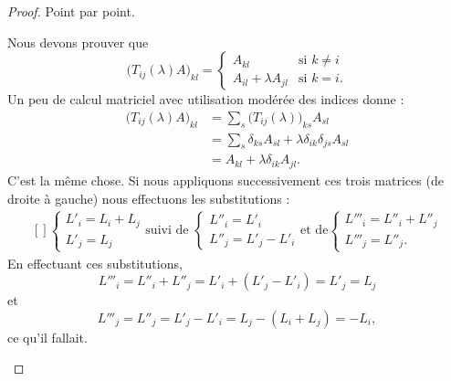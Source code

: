 \begin{proof}
	Point par point.
	\begin{subproof}
		Nous devons prouver que
		\begin{equation}
			\big( T_{ij}(\lambda)A \big)_{kl}=\begin{cases}
				A_{kl}                & \text{si } k\neq i \\
				A_{il}+\lambda A_{jl} & \text{si } k=i.
			\end{cases}
		\end{equation}
		Un peu de calcul matriciel avec utilisation modérée des indices donne :
		\begin{subequations}
			\begin{align}
				\big( T_{ij}(\lambda)A \big)_{kl} & =\sum_s\big( T_{ij}(\lambda) \big)_{ks}A_{sl}                \\
				                                  & =\sum_s\delta_{ks}A_{sl}+\lambda\delta_{ik}\delta_{js}A_{sl} \\
				                                  & =A_{kl}+\lambda\delta_{ik}A_{jl}.
			\end{align}
		\end{subequations}
		 C'est la même chose.
		 Si nous appliquons successivement ces trois matrices (de droite à gauche) nous effectuons les substitutions :
		\begin{equation}
			\begin{aligned}[]
				\begin{cases}
					L'_i=L_i+L_j \\
					L'_j=L_j
				\end{cases}
				\text{suivi de }
				\begin{cases}
					L''_i=L'_i \\
					L''_j=L'_j-L'_i
				\end{cases}
				\text{et de}
				\begin{cases}
					L'''_i=L''_i+L''_j \\
					L'''_j=L''_j.
				\end{cases}
			\end{aligned}
		\end{equation}
		En effectuant ces substitutions,
		\begin{equation}
			L'''_i=L''_i+L''_j=L'_i+(L'_j-L'_i)=L'_j=L_j
		\end{equation}
		et
		\begin{equation}
			L'''_j=L''_j=L'_j-L'_i=L_j-(L_i+L_j)=-L_i,
		\end{equation}
		ce qu'il fallait.
	\end{subproof}
\end{proof}

